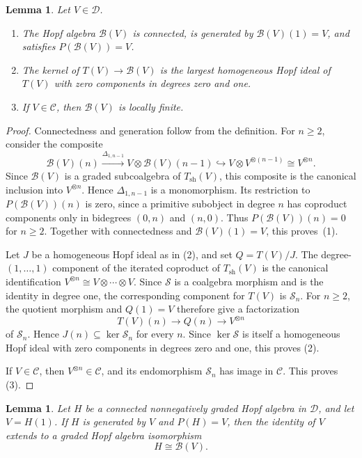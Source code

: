 \documentclass[11pt, a4paper]{article}
\numberwithin{equation}{section}
\newcommand{\C}{\mathcal C}
\newcommand{\D}{\mathcal D}
\newcommand{\B}{\mathcal B}
\newtheorem{lemma}[theorem]{Lemma}
\begin{document}
\begin{lemma}\label{pre:nichols-properties}
Let $V\in\D$.
\begin{enumerate}
 \item The Hopf algebra $\B(V)$ is connected, is generated by
 $\B(V)(1)=V$, and satisfies $P(\B(V))=V$.
 \item The kernel of $T(V)\longrightarrow\B(V)$ is the largest
 homogeneous Hopf ideal of $T(V)$ with zero components in degrees
 zero and one.
 \item If $V\in\C$, then $\B(V)$ is locally finite.
\end{enumerate}
\end{lemma}

\begin{proof}

Connectedness and generation follow from the definition.
For $n\geq2$, consider the composite
\[
 \B(V)(n)
 \xrightarrow{\Delta_{1,n-1}}
 V\otimes\B(V)(n-1)
 \hookrightarrow V\otimes V^{\otimes(n-1)}
 \cong V^{\otimes n}.
\]
Since $\B(V)$ is a graded subcoalgebra of $T_{\mathrm{sh}}(V)$,
this composite is the canonical inclusion into $V^{\otimes n}$.
Hence $\Delta_{1,n-1}$ is a monomorphism.
Its restriction to $P(\B(V))(n)$ is zero, since a primitive
subobject in degree $n$ has coproduct components only in
bidegrees $(0,n)$ and $(n,0)$.
Thus $P(\B(V))(n)=0$ for $n\geq2$.
Together with connectedness and $\B(V)(1)=V$, this proves~(1).



Let $J$ be a homogeneous Hopf ideal as in (2), and set $Q=T(V)/J$.
The degree-$(1,\ldots,1)$ component of the iterated coproduct
of $T_{\mathrm{sh}}(V)$ is the canonical identification
$V^{\otimes n}\cong V\otimes\cdots\otimes V$.
Since $\mathcal S$ is a coalgebra morphism and is the identity
in degree one, the corresponding component for $T(V)$ is
$\mathcal S_n$.
For $n\geq2$, the quotient morphism and $Q(1)=V$ therefore give
a factorization
\[
 T(V)(n)\longrightarrow Q(n)\longrightarrow V^{\otimes n}
\]
of $\mathcal S_n$. Hence $J(n)\subseteq\ker\mathcal S_n$ for every
$n$. Since $\ker\mathcal S$ is itself a homogeneous Hopf ideal with
zero components in degrees zero and one, this proves (2).


If $V\in\C$, then $V^{\otimes n}\in\C$, and its endomorphism
$\mathcal S_n$ has image in $\C$. This proves (3).
\end{proof}

\begin{lemma}\label{pre:nichols-characterization}
Let $H$ be a connected nonnegatively graded Hopf algebra in $\D$, and
let $V=H(1)$. If $H$ is generated by $V$ and $P(H)=V$, then the identity
of $V$ extends to a graded Hopf algebra isomorphism
\[
 H\cong\B(V).
\]
\end{lemma}
\end{document}
